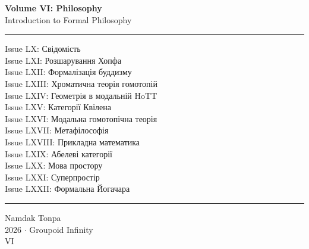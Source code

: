 \documentclass{article}
\begin{document}
\begin{titlepage}
    \centering
    \vspace*{0.5in}
    \Huge
    \textbf{Volume VI: Philosophy} \\
    \LARGE
    Introduction to Formal Philosophy \\
    \vspace{1.5in}
    \small
    \flushleft
    \vspace{-2mm} \rule{\textwidth}{0.4pt}
    Issue LX: Свідомість \\
    Issue LXI: Розшарування Хопфа \\
    Issue LXII: Формалізація буддизму \\
    Issue LXIII: Хроматична теорія гомотопій \\
    Issue LXIV: Геометрія в модальній HoTT \\
    Issue LXV: Категорії Квілена \\
    Issue LXVI: Модальна гомотопічна теорія \\
    Issue LXVII: Метафілософія \\
    Issue LXVIII: Прикладна математика \\
    Issue LXIX: Абелеві категорії \\
    Issue LXX: Мова простору \\
    Issue LXXI: Суперпростір \\
    Issue LXXII: Формальна Йогачара \\
    \vspace{-2mm} \rule{\textwidth}{0.4pt}
    \centering
    \vfill
    \large
    Namdak Tonpa \\
    \Large
    2026 $\cdot$ Groupoid Infinity \\
    VI
\end{titlepage}

\tableofcontents
\newif\ifincludeTOC














\end{document}

